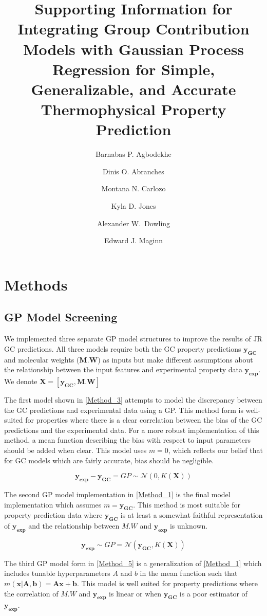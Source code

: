 \documentclass[journal=jacsat,manuscript=article]{achemso}
\author{Barnabas P. Agbodekhe}
\author{Dinis O. Abranches}
\author{Montana N. Carlozo}
\author{Kyla D. Jones}
\author{Alexander W.~Dowling}
\author{Edward J. Maginn}
\affiliation[University of Notre Dame]
{Department of Chemical and Biomolecular Engineering, University of Notre Dame, Notre Dame, IN 46556, USA}
\title{Supporting Information for \\ Integrating Group Contribution Models with Gaussian Process Regression for Simple, Generalizable, and Accurate Thermophysical Property Prediction}
\begin{document}
\newpage

\section{Methods}



\subsection{GP Model Screening}
We implemented three separate GP model structures to improve the results of JR GC predictions. All three models require both the GC property predictions $\mathbf{y_{GC}}$ and molecular weights ($\mathbf{M.W}$) as inputs but make different assumptions about the relationship between the input features and experimental property data $\mathbf{y_{\text{exp}}}$. We denote $\mathbf{X} = [\mathbf{y_{GC}}, \mathbf{M.W}]$

The first model shown in \eqref{Method_3} attempts to model the discrepancy between the GC predictions and experimental data using a GP. This method form is well-suited for properties where there is a clear correlation between the bias of the GC predictions and the experimental data. For a more robust implementation of this method, a mean function describing the bias with respect to input parameters should be added when clear. This model uses $m=0$, which reflects our belief that for GC models which are fairly accurate, bias should be negligible. 

\begin{equation}
    \mathbf{y_{\text{exp}}} - \mathbf{y_{GC}} = GP \sim \mathcal{N}\left(0, K(\mathbf{X}) \right)
    \label{Method_3}
\end{equation}

The second GP model implementation in \eqref{Method_1} is the final model implementation which assumes $m = \mathbf{y_{GC}}$. This method is most suitable for property prediction data where $\mathbf{y_{GC}}$ is at least a somewhat faithful representation of $\mathbf{y_{\text{exp}}}$ and the relationship between $M.W$ and $\mathbf{y_{\text{exp}}}$ is unknown.

\begin{equation}
    \mathbf{y_{\text{exp}}} \sim  GP = \mathcal{N}\left(\mathbf{y_{GC}}, K(\mathbf{X}) \right)
    \label{Method_1}
\end{equation}

The third GP model form in \eqref{Method_5} is a generalization of \eqref{Method_1} which includes tunable hyperparameters $A$ and $b$ in the mean function such that $m(\mathbf{x} \vert \mathbf{A},\mathbf{b}) = \mathbf{A}\mathbf{x} + \mathbf{b}$. This model is well suited for property predictions where the correlation of $M.W$ and $\mathbf{y_{\text{exp}}}$ is linear or when $\mathbf{y_{GC}}$ is a poor estimator of $\mathbf{y_{\text{exp}}}$.
\end{document}

